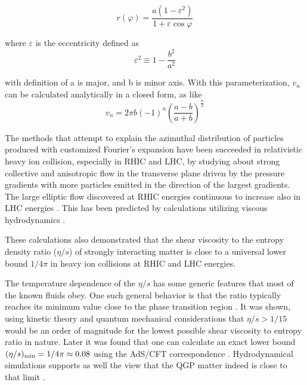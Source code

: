 \begin{equation}
	r(\varphi) = \frac{a(1-\varepsilon^2)}{1+\varepsilon \cos \varphi}
\end{equation}
\smallskip

	where $\varepsilon$ is the eccentricity defined as 
\begin{equation}
	\varepsilon^2 \equiv 1 - \frac{b^2}{a^2}
\end{equation}

	with definition of a is major, and b is minor axis. With this parameterization, $v_n$ can be calculated analytically in a closed form, as like
\begin{equation}
	v_n = 2\pi b(-1)^{n}(\frac{a-b}{a+b})^{\frac{n}{2}}
\end{equation}

	The methods that attempt to explain the azimuthal distribution of particles produced with customized Fourier's expansion have been succeeded in relativistic heavy ion collision, especially in RHIC and LHC, by studying about strong collective and anisotropic flow in the transverse plane driven by the pressure gradients with more particles emitted in the direction of the largest gradients. The large elliptic flow discovered at RHIC energies \cite{Ackermann:2000tr} continuous to increase also in LHC energies \cite{Aamodt:2010pa,Adam:2016izf}. This has been predicted by calculations utilizing viscous hydrodynamics \cite{Romatschke:2007mq,Shen:2011eg,Schenke:2011zz,Bozek:2012qs,Gale:2012rq,Hirano:2010je}.

These calculations also demonstrated that the shear viscosity to the entropy density ratio ($\eta/s$) of strongly interacting matter is close to a universal lower bound $1/4\pi$ \cite{Kovtun:2004de} in heavy ion collisions at RHIC and LHC energies.

The temperature dependence of the $\eta/s$ has some generic features that most of the known fluids obey. One such general behavior is that the ratio typically reaches its minimum value close to the phase transition region \cite{Lacey:2006bc}. 
It was shown, using kinetic theory and quantum mechanical considerations \cite{PhysRevD.31.53} that $\eta/s>1/15$ would be an order of magnitude for the lowest possible shear viscosity to entropy ratio in nature. Later it was found that one can calculate an exact lower bound $(\eta/s)_{\rm min}=1/4\pi\approx0.08$ using the AdS/CFT correspondence \cite{Kovtun:2004de}. Hydrodynamical simulations supports as well the view that the QGP matter indeed is close to that limit \cite{Gale:2012rq}. 	
	
